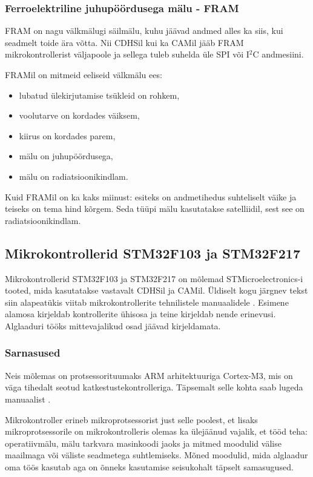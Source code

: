 \documentclass[12pt,a4paper]{article}
\newcommand{\iic}{I\({}^2\)C }
\begin{document}
\subsubsection{Ferroelektriline juhupöördusega mälu - FRAM}
FRAM on nagu välkmälugi säilmälu, kuhu jäävad andmed alles ka siis, kui seadmelt
toide ära võtta. Nii CDHSil kui ka CAMil jääb FRAM mikrokontrollerist väljapoole
ja sellega tuleb suhelda üle SPI või \iic andmesiini.

FRAMil on mitmeid eeliseid välkmälu ees:
\begin{itemize}
	\item lubatud ülekirjutamise tsükleid on rohkem,
	\item voolutarve on kordades väiksem,
	\item kiirus on kordades parem,
	\item mälu on juhupöördusega,
	\item mälu on radiatsioonikindlam.
\end{itemize}
Kuid FRAMil on ka kaks miinust: esiteks on andmetihedus suhteliselt väike ja teiseks
on tema hind kõrgem. Seda tüüpi mälu kasutatakse satelliidil, sest see on
radiatsioonikindlam. \cite{fram}

\subsection{Mikrokontrollerid STM32F103 ja STM32F217}
\label{sec:mcu}
Mikrokontrollerid STM32F103 ja STM32F217 on mõlemad STMicroelectronics-i tooted,
mida kasutatakse vastavalt CDHSil ja CAMil. Üldiselt kogu järgnev tekst siin
alapeatükis viitab mikrokontrollerite tehnilistele manuaalidele
\cite{f1rm,f2rm}. Esimene alamosa kirjeldab kontrollerite ühisosa ja teine
kirjeldab nende erinevusi. Alglaaduri tööks mittevajalikud osad jäävad
kirjeldamata.
\subsubsection{Sarnasused}
Neis mõlemas on protsessorituumaks ARM arhitektuuriga Cortex-M3, mis on väga
tihedalt seotud katkestustekontrolleriga. Täpsemalt selle kohta saab lugeda
manuaalist \cite{CM3pm}.

Mikrokontroller erineb mikroprotsessorist just selle poolest, et lisaks
mikroprotsessorile on mikrokontrolleris olemas ka ülejäänud vajalik, et tööd
teha: operatiivmälu, mälu tarkvara masinkoodi jaoks ja mitmed moodulid välise
maailmaga või väliste seadmetega suhtlemiseks. Mõned moodulid, mida alglaadur
oma töös kasutab aga on õnneks kasutamise seisukohalt täpselt samasugused.
\end{document}
